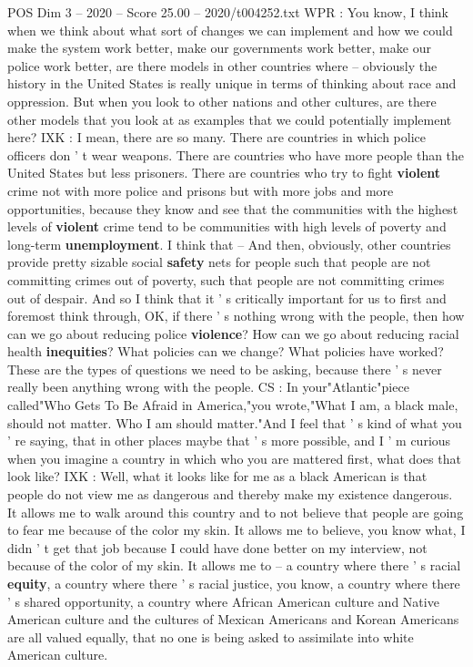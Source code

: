 \begin{textsample}{POS Dim 3 – 2020 – Score 25.00 – 2020/t004252.txt}
WPR : You know, I think when we think about what sort of changes we can implement and how we could make the system work better, make our governments work better, make our police work better, are there models in other countries where -- obviously the history in the United States is really unique in terms of thinking about race and oppression.
But when you look to other nations and other cultures, are there other models that you look at as examples that we could potentially implement here?
IXK : I mean, there are so many.
There are countries in which police officers don ' t wear weapons.
There are countries who have more people than the United States but less prisoners.
There are countries who try to fight \textbf{violent} crime not with more police and prisons but with more jobs and more opportunities, because they know and see that the communities with the highest levels of \textbf{violent} crime tend to be communities with high levels of poverty and long-term \textbf{unemployment}.
I think that -- And then, obviously, other countries provide pretty sizable social \textbf{safety} nets for people such that people are not committing crimes out of poverty, such that people are not committing crimes out of despair.
And so I think that it ' s critically important for us to first and foremost think through, OK, if there ' s nothing wrong with the people, then how can we go about reducing police \textbf{violence}?
How can we go about reducing racial health \textbf{inequities}?
What policies can we change?
What policies have worked?
These are the types of questions we need to be asking, because there ' s never really been anything wrong with the people.
CS : In your"Atlantic"piece called"Who Gets To Be Afraid in America,"you wrote,"What I am, a black male, should not matter.
Who I am should matter."And I feel that ' s kind of what you ' re saying, that in other places maybe that ' s more possible, and I ' m curious when you imagine a country in which who you are mattered first, what does that look like?
IXK : Well, what it looks like for me as a black American is that people do not view me as dangerous and thereby make my existence dangerous.
It allows me to walk around this country and to not believe that people are going to fear me because of the color my skin.
It allows me to believe, you know what, I didn ' t get that job because I could have done better on my interview, not because of the color of my skin.
It allows me to -- a country where there ' s racial \textbf{equity}, a country where there ' s racial justice, you know, a country where there ' s shared opportunity, a country where African American culture and Native American culture and the cultures of Mexican Americans and Korean Americans are all valued equally, that no one is being asked to assimilate into white American culture.

\end{textsample}
